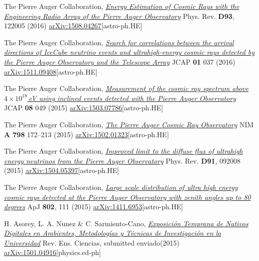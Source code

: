 \begin{etaremune}
\item {}The Pierre Auger Collaboration, \href{http://journals.aps.org/prd/abstract/10.1103/PhysRevD.93.122005}{\emph{Energy Estimation of Cosmic Rays with the Engineering Radio Array of the Pierre Auger Observatory}} Phys. Rev. {\bf D93}, 122005 (2016) \href{http://arxiv.org/abs/1508.04267}{arXiv:1508.04267}[astro-ph.HE]

\item {}The Pierre Auger Collaboration, \href{http://dx.doi.org/10.1088/1475-7516/2016/01/037}{\emph{Search for correlations between the arrival directions of IceCube neutrino events and ultrahigh-energy cosmic rays detected by the Pierre Auger Observatory and the Telescope Array}} JCAP {\bf{01}} 037 (2016) \href{http://arxiv.org/abs/1511.09408}{arXiv:1511.09408}[astro-ph.HE]

\item {}The Pierre Auger Collaboration, \href{http://dx.doi.org/10.1088/1475-7516/2015/08/049}{\emph{Measurement of the cosmic ray spectrum above $4\times 10^{18}$\,eV using inclined events detected with the Pierre Auger Observatory}} JCAP {\bf{08}} 049 (2015) \href{http://arxiv.org/abs/1503.07786}{arXiv:1503.07786}[astro-ph.HE]

\item {}The Pierre Auger Collaboration, \href{http://dx.doi.org/10.1016/j.nima.2015.06.058}{\emph{The Pierre Auger Cosmic Ray Observatory}} NIM {\bf{A 798}} 172--213 (2015) \href{http://arxiv.org/abs/1502.01323}{arXiv:1502.01323}[astro-ph.HE]

\item {}The Pierre Auger Collaboration, \href{http://dx.doi.org/10.1103/PhysRevD.91.092008}{\emph{Improved limit to the diffuse flux of ultrahigh energy neutrinos from the Pierre Auger Observatory}} Phys. Rev. {\bf{D91}}, 092008 (2015) \href{http://arxiv.org/abs/1504.05397}{arXiv:1504.05397}[astro-ph.HE]

\item {}The Pierre Auger Collaboration, \href{http://dx.doi.org/}{\emph{Large scale distribution of ultra high energy cosmic rays detected at the Pierre Auger Observatory with zenith angles up to 80 degrees}} ApJ {\bf{802}}, 111 (2015) \href{http://arxiv.org/abs/1411.6953}{arXiv:1411.6953}[astro-ph.HE]

\item {} H. Asorey, L. A. Nunez \& C. Sarmiento-Cano, \href{http://dx.doi.org/}{\emph{Exposición Temprana de Nativos Digitales en Ambientes, Metodologías y Técnicas de Investigación en la Universidad}} Rev. Ens. Ciencias, \ifeng submitted \else enviado\fi (2015) \href{http://arxiv.org/abs/1501.04916}{arXiv:1501.04916}[physics.ed-ph]


\end{etaremune}
